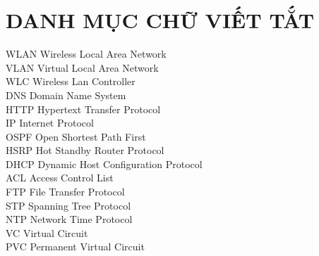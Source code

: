 \documentclass[a4paper, 12pt]{article}
\begin{document}
\section*{DANH MỤC CHỮ VIẾT TẮT}
\hspace*{0.25cm}WLAN  \hspace*{1cm}Wireless Local Area Network\\
\hspace*{1cm}VLAN     \hspace*{1cm}Virtual Local Area Network\\
\hspace*{1cm}WLC      \hspace*{1.25cm}Wireless Lan Controller\\
\hspace*{1cm}DNS      \hspace*{1.45cm}Domain Name System \\
\hspace*{1cm}HTTP     \hspace*{1.25cm}Hypertext Transfer Protocol\\
\hspace*{1cm}IP       \hspace*{2cm}Internet Protocol \\
\hspace*{1cm}OSPF     \hspace*{1.25cm}Open Shortest Path First   \\
\hspace*{1cm}HSRP     \hspace*{1.25cm}Hot Standby Router Protocol  \\
\hspace*{1cm}DHCP     \hspace*{1.25cm}Dynamic Host Configuration Protocol\\
\hspace*{1cm}ACL      \hspace*{1.5cm}Access Control List \\
\hspace*{1cm}FTP      \hspace*{1.5cm}File Transfer Protocol  \\
\hspace*{1cm}STP      \hspace*{1.5cm}Spanning Tree Protocol \\
\hspace*{1cm}NTP      \hspace*{1.5cm}Network Time Protocol \\
\hspace*{1cm}VC       \hspace*{1.5cm}Virtual Circuit\\
\hspace*{1cm}PVC      \hspace*{1.5cm}Permanent Virtual Circuit \\
\cleardoublepage
\end{document}
